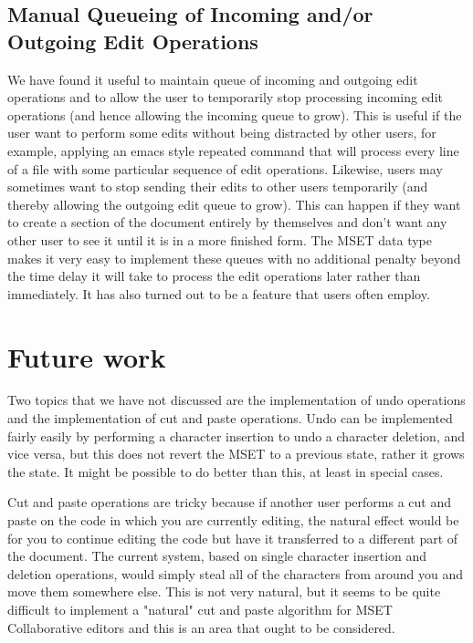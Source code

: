 \documentclass{amsart}
\begin{document}
\subsection{Manual Queueing of Incoming and/or Outgoing Edit Operations}
We have found it useful to maintain queue of incoming and outgoing edit operations
and to allow the user to temporarily stop processing incoming edit operations (and hence allowing the incoming queue to grow).  This is useful if the user want to perform some edits without being distracted by other users, for example, applying an emacs style repeated command that will process every line of a file with some particular sequence of edit operations.  Likewise, users may sometimes want to stop sending their edits to other users temporarily (and thereby allowing the outgoing edit queue to grow).  This can happen if they want to create a section of the document entirely by themselves and don't want any other user to see it until it is in a more finished form.  The MSET data type makes it very easy to implement these queues with no additional penalty beyond the time delay it will take to process the edit operations later rather than immediately. It has also turned out to be a feature that users often employ.

\section{Future work}
Two topics that we have not discussed are the implementation of undo operations
and the implementation of cut and paste operations.  Undo can be implemented fairly easily by performing a character insertion to undo a character deletion, and vice versa, but this does not revert the MSET to a previous state, rather it grows the state.  It might be possible to do better than this, at least in special cases.

Cut and paste operations are tricky because if another user performs a cut and paste on the code in which you are currently editing, the natural effect would be for you to continue editing the code but have it transferred to a different part of the document.  The current system, based on single character insertion and deletion operations, would simply steal all of the characters from around you and move them somewhere else. This is not very natural, but it seems to be quite difficult to implement a "natural" cut and paste algorithm for MSET Collaborative editors and this is an area that ought to be considered.








\end{document}
